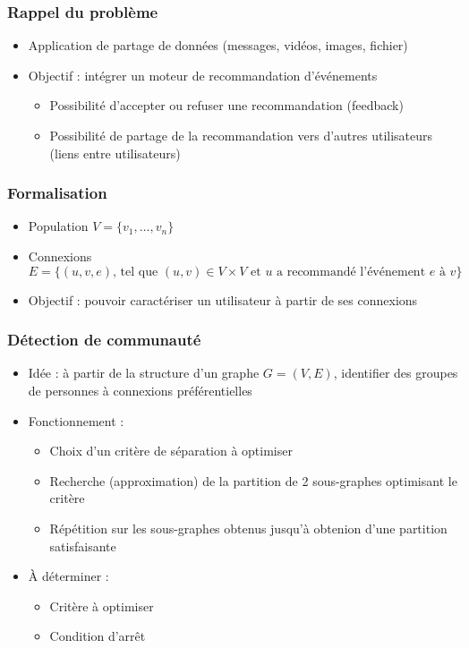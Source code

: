 \documentclass[c]{beamer}
\author{Igor Colin}
\date{\today}
\begin{document}
\begin{frame}
    \frametitle{Rappel du problème}

    \begin{itemize}
        \item Application de partage de donn\'ees (messages, vid\'eos, images, fichier)
        \item Objectif : int\'egrer un moteur de recommandation d'\'ev\'enements
            \begin{itemize}
                \item Possibilit\'e d'accepter ou refuser une recommandation (feedback)
                \item Possibilit\'e de partage de la recommandation vers d'autres utilisateurs (liens entre utilisateurs)
            \end{itemize}
    \end{itemize}
\end{frame}

\begin{frame}
    \frametitle{Formalisation}

    \begin{itemize}
        \item Population $V = \{ v_1, \dots, v_n \}$
        \item Connexions $E = \{ (u,v,e) \text{, tel que } (u,v) \in V \times V \text{ et } u \text{ a recommand\'e l'\'ev\'enement } e \text{ à } v \}$
        \item Objectif : pouvoir caract\'eriser un utilisateur à partir de ses connexions
    \end{itemize}
\end{frame}

\begin{frame}
    \frametitle{D\'etection de communaut\'e}

    \begin{itemize}
        \item Id\'ee : à partir de la structure d'un graphe $G = (V,E)$, identifier des groupes
            de personnes à connexions pr\'ef\'erentielles
        \item Fonctionnement :
            \begin{itemize}
                \item Choix d'un critère de s\'eparation à optimiser
                \item Recherche (approximation) de la partition de 2 sous-graphes optimisant le critère
                \item R\'ep\'etition sur les sous-graphes obtenus jusqu'à obtenion d'une partition satisfaisante
            \end{itemize}
        \item \`A d\'eterminer :
            \begin{itemize}
                \item Critère à optimiser
                \item Condition d'arrêt
            \end{itemize}
    \end{itemize}
\end{frame}
\end{document}
